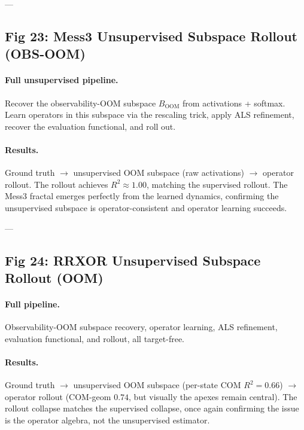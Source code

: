 \documentclass[11pt]{article}
\begin{document}
---

\subsection{Fig 23: Mess3 Unsupervised Subspace Rollout (OBS-OOM)}

\paragraph{Full unsupervised pipeline.}

Recover the observability-OOM subspace $B_{\text{OOM}}$ from activations + softmax. Learn operators in this subspace via the rescaling trick, apply ALS refinement, recover the evaluation functional, and roll out.

\paragraph{Results.}

Ground truth $\to$ unsupervised OOM subspace (raw activations) $\to$ operator rollout. The rollout achieves $R^2 \approx 1.00$, matching the supervised rollout. The Mess3 fractal emerges perfectly from the learned dynamics, confirming the unsupervised subspace is operator-consistent and operator learning succeeds.


---

\subsection{Fig 24: RRXOR Unsupervised Subspace Rollout (OOM)}

\paragraph{Full pipeline.}

Observability-OOM subspace recovery, operator learning, ALS refinement, evaluation functional, and rollout, all target-free.

\paragraph{Results.}

Ground truth $\to$ unsupervised OOM subspace (per-state COM $R^2 = 0.66$) $\to$ operator rollout (COM-geom $0.74$, but visually the apexes remain central). The rollout collapse matches the supervised collapse, once again confirming the issue is the operator algebra, not the unsupervised estimator.
\end{document}
